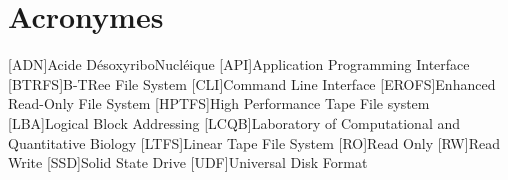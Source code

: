 
\chapter*{Acronymes}
\begin{acronym}
	[ADN]{Acide DésoxyriboNucléique}
	[API]{Application Programming Interface}
	[BTRFS]{B-TRee File System}
	[CLI]{Command Line Interface}
	[EROFS]{Enhanced Read-Only File System}
	[HPTFS]{High Performance Tape File system}
	[LBA]{Logical Block Addressing}
	[LCQB]{Laboratory of Computational and Quantitative Biology}
	[LTFS]{Linear Tape File System}
	[RO]{Read Only}
	[RW]{Read Write}
	[SSD]{Solid State Drive}
	[UDF]{Universal Disk Format}
\end{acronym}
